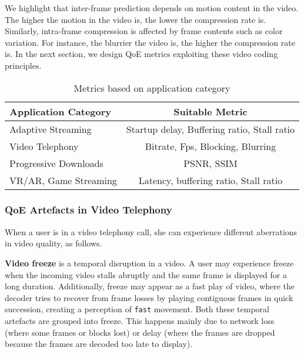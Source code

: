 We highlight that inter-frame prediction depends on motion content in the video. The higher the motion in the video is, the lower the compression rate is. Similarly, intra-frame compression is affected by frame contents such as color variation. For instance, the blurrier the video is, the higher the compression rate is. In the next section, we design QoE metrics exploiting these video coding principles.

\begin{table}[t]
	\centering
			\begin{tabular}{l|c}				
				\hline \hline
				\textbf{Application Category} & \textbf{Suitable Metric} \\
				\hline
				\hline
				Adaptive Streaming & Startup delay, Buffering ratio, Stall ratio \\ \hline
				Video Telephony & Bitrate, Fps, Blocking, Blurring \\ \hline
				Progressive Downloads & PSNR, SSIM \\ \hline
				VR/AR, Game Streaming & Latency, buffering ratio, Stall ratio \\ \hline 
			\end{tabular}
		\hfill 
		\caption{Metrics based on application category}
		\label{tab:qoe_metric}
\end{table}

\pagebreak

\subsubsection{QoE Artefacts in Video Telephony}

When a user is in a video telephony call, she can experience different aberrations in video quality, as follows.

\noindent \textbf{Video freeze} is a temporal disruption in a video. A user may experience freeze when the incoming video stalls abruptly and the same frame is displayed for a long duration. Additionally, freeze may appear as a fast play of video, where the decoder tries to recover from frame losses by playing contiguous frames in quick succession, creating a perception of \texttt{fast} movement. Both these temporal artefacts are grouped into freeze. 
This happens mainly due to network loss (where some frames or blocks lost) or delay (where the frames are dropped because the frames are decoded too late to display). 

